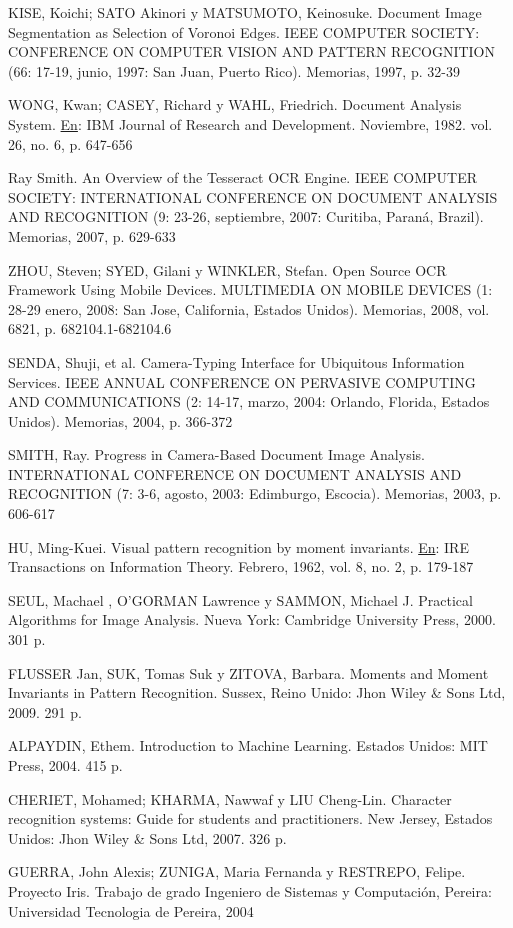 \documentclass[a4paper, 12pt, oneside]{article}
\begin{document}
	KISE, Koichi; SATO Akinori y MATSUMOTO, Keinosuke. Document Image Segmentation as Selection of Voronoi Edges. IEEE COMPUTER SOCIETY: CONFERENCE ON COMPUTER VISION AND PATTERN RECOGNITION (66: 17-19, junio, 1997: San Juan, Puerto Rico). Memorias, 1997, p. 32-39
	
	WONG, Kwan; CASEY, Richard y WAHL, Friedrich. Document Analysis System. \underline{En}: IBM Journal of Research and Development. Noviembre, 1982. vol. 26, no. 6, p. 647-656
	
	Ray Smith. An Overview of the Tesseract OCR Engine. IEEE COMPUTER SOCIETY: INTERNATIONAL CONFERENCE ON DOCUMENT ANALYSIS AND RECOGNITION (9: 23-26, septiembre, 2007: Curitiba, Paraná, Brazil). Memorias, 2007, p. 629-633
	
	ZHOU, Steven; SYED, Gilani y WINKLER, Stefan. Open Source OCR Framework Using Mobile Devices. MULTIMEDIA ON MOBILE DEVICES (1: 28-29 enero, 2008: San Jose, California, Estados Unidos). Memorias, 2008, vol. 6821, p. 682104.1-682104.6
	
	SENDA, Shuji, et al. Camera-Typing Interface for Ubiquitous Information Services. IEEE ANNUAL CONFERENCE ON PERVASIVE COMPUTING AND COMMUNICATIONS (2: 14-17, marzo, 2004: Orlando, Florida, Estados Unidos). Memorias, 2004, p. 366-372
	
	SMITH, Ray. Progress in Camera-Based Document Image Analysis. INTERNATIONAL CONFERENCE ON DOCUMENT ANALYSIS AND RECOGNITION (7: 3-6, agosto, 2003: Edimburgo, Escocia). Memorias, 2003, p. 606-617
	
	HU, Ming-Kuei. Visual pattern recognition by moment invariants. \underline{En}: IRE Transactions on Information Theory. Febrero, 1962, vol. 8, no. 2, p. 179-187
	
	SEUL, Machael , O'GORMAN Lawrence y SAMMON, Michael J. Practical Algorithms for Image Analysis. Nueva York: Cambridge University Press, 2000. 301 p.
	
	FLUSSER Jan, SUK, Tomas Suk y ZITOVA, Barbara. Moments and Moment Invariants in Pattern Recognition. Sussex, Reino Unido: Jhon Wiley \& Sons Ltd, 2009. 291 p.
	
	ALPAYDIN, Ethem. Introduction to Machine Learning. Estados Unidos: MIT Press, 2004. 415 p.
	
	CHERIET, Mohamed; KHARMA, Nawwaf y LIU Cheng-Lin. Character recognition systems: Guide for students and practitioners. New Jersey, Estados Unidos: Jhon Wiley \& Sons Ltd, 2007. 326 p.
	
	GUERRA, John Alexis; ZUNIGA, Maria Fernanda y RESTREPO, Felipe. Proyecto Iris. Trabajo de grado Ingeniero de Sistemas y Computación, Pereira: Universidad Tecnologia de Pereira, 2004
	
\end{document}
